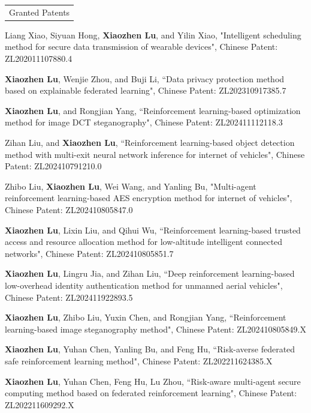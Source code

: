 \documentclass{article}
\renewcommand{\section}[1]{%
  \begin{tabular}{p{\dimexpr\linewidth-2\tabcolsep}}
    \cellcolor{black!10}\large\strut #1
  \end{tabular}%
}
\begin{document}
\section{Granted Patents}
\begin{justifying}
\begin{myreferences}
    \item Liang Xiao, Siyuan Hong, \textbf{Xiaozhen Lu}, and Yilin Xiao, "Intelligent scheduling method for secure data transmission of wearable devices", Chinese Patent: ZL202011107880.4


	\item \textbf{Xiaozhen Lu}, Wenjie Zhou, and Buji Li, ``Data privacy protection method based on explainable federated learning", Chinese Patent: ZL202310917385.7
	
	
	\item \textbf{Xiaozhen Lu}, and Rongjian Yang, ``Reinforcement learning-based optimization method for image DCT steganography", Chinese Patent: ZL202411112118.3
	
	
	\item Zihan Liu, and \textbf{Xiaozhen Lu}, ``Reinforcement learning-based object detection method with multi-exit neural network inference for internet of vehicles", Chinese Patent: ZL202410791210.0
	\item Zhibo Liu, \textbf{Xiaozhen Lu}, Wei Wang, and Yanling Bu, "Multi-agent reinforcement learning-based AES encryption method for internet of vehicles", Chinese Patent: ZL202410805847.0
	\item \textbf{Xiaozhen Lu}, Lixin Liu, and Qihui Wu, ``Reinforcement learning-based trusted access and resource allocation method for low-altitude intelligent connected networks", Chinese Patent: ZL202410805851.7
	\item \textbf{Xiaozhen Lu}, Lingru Jia, and Zihan Liu, ``Deep reinforcement learning-based low-overhead identity authentication method for unmanned aerial vehicles", Chinese Patent: ZL202411922893.5
	
	
	\item \textbf{Xiaozhen Lu}, Zhibo Liu, Yuxin Chen, and Rongjian Yang, ``Reinforcement learning-based image steganography method", Chinese Patent: ZL202410805849.X
	
	
	\item \textbf{Xiaozhen Lu}, Yuhan Chen, Yanling Bu, and Feng Hu, ``Risk-averse federated safe reinforcement learning method", Chinese Patent: ZL202211624385.X
	
	
	\item \textbf{Xiaozhen Lu}, Yuhan Chen, Feng Hu, Lu Zhou, ``Risk‑aware multi‑agent secure computing method based on federated reinforcement learning", Chinese Patent: ZL202211609292.X
	

\end{myreferences}
\end{justifying}
\end{document}
